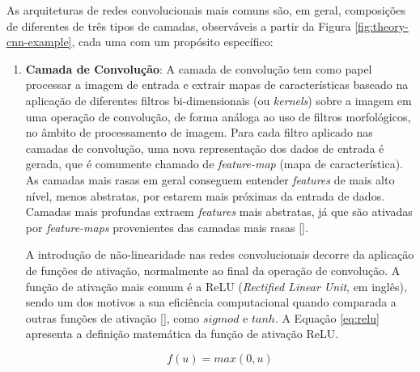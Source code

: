 As arquiteturas de redes convolucionais mais comuns são, em geral, composições de diferentes de três tipos de camadas, observáveis a partir da Figura \ref{fig:theory-cnn-example}, cada uma com um propósito específico:
\begin{enumerate}
    \item \textbf{Camada de Convolução}:
            A camada de convolução tem como papel processar a imagem de entrada e extrair mapas de características baseado na aplicação de diferentes filtros bi-dimensionais (ou \textit{kernels}) sobre a imagem em uma operação de convolução, de forma análoga ao uso de filtros morfológicos, no âmbito de processamento de imagem. Para cada filtro aplicado nas camadas de convolução, uma nova representação dos dados de entrada é gerada, que é comumente chamado de \textit{feature-map} (mapa de característica). As camadas mais rasas em geral conseguem entender \textit{features} de mais alto nível, menos abstratas, por estarem mais próximas da entrada de dados. Camadas mais profundas extraem \textit{features} mais abstratas, já que são ativadas por \textit{feature-maps} provenientes das camadas mais rasas [].
        
            A introdução de não-linearidade nas redes convolucionais decorre da aplicação de funções de ativação, normalmente ao final da operação de convolução. A função de ativação mais comum é a ReLU (\textit{Rectified Linear Unit}, em inglês), sendo um dos motivos a sua eficiência computacional quando comparada a outras funções de ativação [], como $sigmod$ e $tanh$. A Equação \ref{eq:relu} apresenta a definição matemática da função de ativação ReLU.
            
            \begin{equation}
                f(u) = max(0,u)
                \label{eq:relu}
            \end{equation}
            

\end{enumerate}
